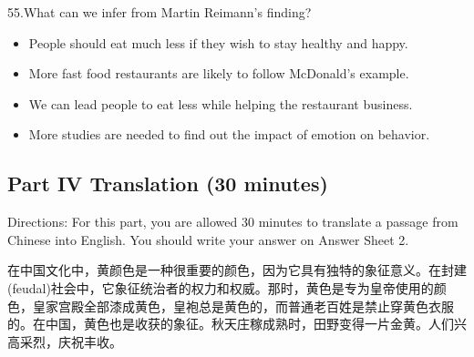 \documentclass[UTF8,11pt]{ctexart}
\begin{document}
55.What can we infer from Martin Reimann’s finding?


\begin{itemize}[leftmargin=2em,itemsep=.2em,topsep=.4em]\item[A.] People should eat much less if they wish to stay healthy and happy.
\item[B.] More fast food restaurants are likely to follow McDonald’s example.
\item[C.] We can lead people to eat less while helping the restaurant business.
\item[D.] More studies are needed to find out the impact of emotion on behavior.
\end{itemize}

\subsection*{\textbf{Part IV Translation (30 minutes)}}


Directions: For this part, you are allowed 30 minutes to translate a passage from Chinese into English. You should write your answer on Answer Sheet 2.


在中国文化中，黄颜色是一种很重要的颜色，因为它具有独特的象征意义。在封建(feudal)社会中，它象征统治者的权力和权威。那时，黄色是专为皇帝使用的颜色，皇家宫殿全部漆成黄色，皇袍总是黄色的，而普通老百姓是禁止穿黄色衣服的。在中国，黄色也是收获的象征。秋天庄稼成熟时，田野变得一片金黄。人们兴高采烈，庆祝丰收。
\end{document}
